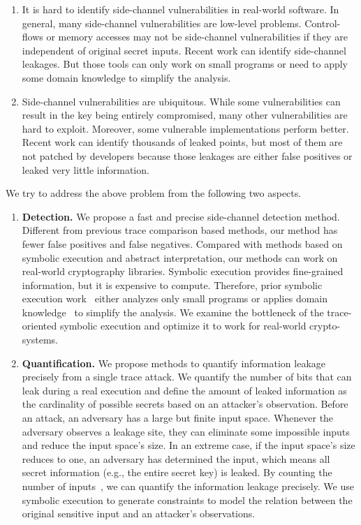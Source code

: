 \begin{enumerate}
    \item It is hard to identify side-channel vulnerabilities in real-world software. In general, many side-channel vulnerabilities are low-level problems. Control-flows or memory accesses may not be side-channel vulnerabilities if they are independent of original secret inputs. Recent work can identify side-channel leakages. But those tools can only work on small programs or need to apply some domain knowledge to simplify the analysis. 
    \item Side-channel vulnerabilities are ubiquitous. While some vulnerabilities can result in the key being entirely compromised, many other vulnerabilities are hard to exploit. Moreover, some vulnerable implementations perform better. Recent work can identify thousands of leaked points, but most of them are not patched by developers because those leakages are either false positives or leaked very little information.  
\end{enumerate}

We try to address the above problem from the following two aspects.
\begin{enumerate}
\item \textbf{Detection.} We propose a fast and precise side-channel detection method. Different from previous trace comparison based methods, our method has fewer false positives and false negatives. Compared with methods based on symbolic execution and abstract interpretation, our methods can work on real-world cryptography libraries. Symbolic execution provides fine-grained information, but it is expensive to compute. Therefore, prior symbolic
execution work~\cite{203878,236338,Brotzman19Casym} either analyzes only
small programs or applies domain knowledge~\cite{203878} to simplify the analysis. We examine the bottleneck of the trace-oriented symbolic execution and optimize it to work for real-world crypto-systems.
\item \textbf{Quantification.} We propose methods to quantify information 
leakage precisely from a single trace attack. We quantify the number of bits that can leak during a real execution and define the amount of leaked information as the cardinality of possible secrets based on an attacker's observation. Before an attack, an adversary has a large but finite input space. Whenever the adversary observes a leakage site, they can eliminate some impossible inputs and reduce the input space's size. In an extreme case, if the input space's size reduces to one, an adversary has determined the input, which means all secret information (e.g., the entire secret key) is
leaked. By counting the number of inputs~\cite{10.1007/11499107_24}, we can quantify the information leakage precisely. We use symbolic execution to generate constraints to model the relation 
between the original sensitive input and an attacker's observations. 
\end{enumerate}


